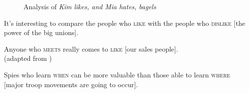\documentclass[output=paper
                ,modfonts
                ,nonflat
	        ,collection
	        ,collectionchapter
	        ,collectiontoclongg
 	        ,biblatex
                ,babelshorthands
                ,newtxmath
                ,draftmode
                ,colorlinks, citecolor=brown
]{./langsci/langscibook}
\begin{document}
{\begin{figure}
      
              
               

               
    \caption{Analysis of \emph{Kim likes, and Mia hates, bagels}}\label{rnrt}
\end{figure}



\begin{exe}
\ex \begin{xlista}
\ex  It's interesting to compare the people who \textsc{like} with the people
       who \textsc{dislike} [the power of the big unions].\\
       \citep[550]{hudson}%

 \ex Anyone  who \textsc{meets} really comes to \textsc{like} [our sales people].\\
 (adapted from \citet[]{williams})\label{will}


\ex   Spies who learn \textsc{when} can be more valuable than those
able to learn \textsc{where} [major troop movements are going to occur].


\end{xlista}
\end{exe}}
\end{document}
